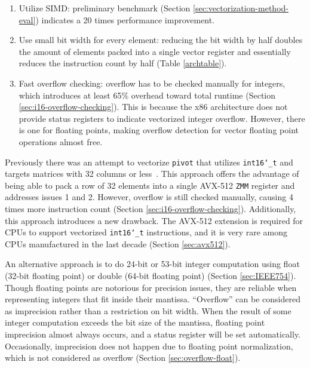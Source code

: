 \documentclass[logo,bsc,singlespacing,parskip]{infthesis}
\newcommand{\dtshort}{\texttt{int16\char`_t}}
\newcommand{\zmm}{\texttt{ZMM}}
\begin{document}
\begin{enumerate}

\item Utilize SIMD: preliminary benchmark (Section \ref{sec:vectorization-method-eval}) indicates a 20 times
performance improvement. 

\item Use small bit width for every element: reducing the bit width by half doubles the amount of elements packed into a single vector register and essentially reduces the instruction count by half (Table \ref{archtable}). 

\item Fast overflow checking: overflow has to be checked manually for integers, which introduces at least 65\% overhead toward total runtime (Section \ref{sec:i16-overflow-checking}). This is because the x86 architecture does not provide status registers to indicate vectorized integer overflow. However, there is one for floating points, making overflow detection for vector floating point operations almost free. 

\end{enumerate}


Previously there was an attempt to vectorize \texttt{pivot} that utilizes \dtshort{} and targets matrices with 32 columns or less~\cite{FPL2}. This approach offers the advantage of being able to pack a row of 32 elements into a single AVX-512 \zmm{} register and addresses issues 1 and 2. However, overflow is still checked manually, causing 4 times more instruction count (Section \ref{sec:i16-overflow-checking}). Additionally, this approach introduces a new drawback. The AVX-512 extension is required for CPUs to support vectorized \dtshort{} instructions, and it is very rare among CPUs manufactured in the last decade (Section \ref{sec:avx512}). 

An alternative approach is to do 24-bit or 53-bit integer computation using float (32-bit floating point) or double (64-bit floating point) (Section \ref{sec:IEEE754}). Though floating points are notorious for precision issues, they are reliable when representing integers that fit inside their mantissa. ``Overflow'' can be considered as imprecision rather than a restriction on bit width. When the result of some integer computation exceeds the bit size of the mantissa, floating point imprecision almost always occurs, and a status register will be set automatically. Occasionally, imprecision does not happen due to floating point normalization, which is not considered as overflow  (Section \ref{sec:overflow-float}).
\end{document}
